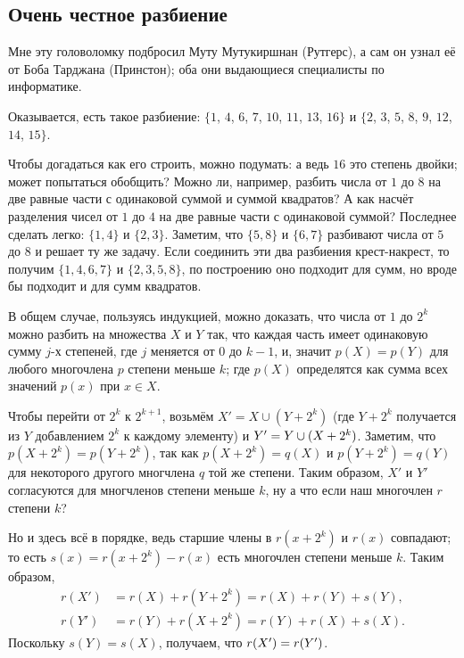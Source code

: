 \subsection*{Очень честное разбиение}

Мне эту головоломку подбросил Муту Мутукиршнан (Рутгерс),
а сам он узнал её от Боба Тарджана (Принстон);
оба они выдающиеся специалисты по информатике.

Оказывается, есть такое разбиение: $\{1$, $4$, $6$, $7$, $10$, $11$, $13$, $16\}$ и $\{2$, $3$, $5$, $8$, $9$, $12$, $14$, $15\}$.

Чтобы догадаться как его строить, можно подумать:
а ведь $16$ это степень двойки;
может попытаться обобщить?
Можно ли, например, разбить числа от $1$ до $8$ на две равные части с одинаковой суммой и суммой квадратов?
А как насчёт разделения чисел от $1$ до $4$ на две равные части с одинаковой суммой?
Последнее сделать легко: $\{1, 4\}$ и $\{2, 3\}$.
Заметим, что $\{5, 8\}$ и $\{6, 7\}$ разбивают числа от $5$ до $8$ и решает ту же задачу.
Если соединить эти два разбиения крест-накрест, то получим $\{1, 4, 6, 7\}$ и $\{2, 3, 5, 8\}$, по построению оно подходит для сумм, но вроде бы подходит и для сумм квадратов.

В общем случае, пользуясь индукцией, можно доказать, что числа от $1$ до $2^k$ можно разбить на множества $X$ и $Y$ так, что каждая часть имеет одинаковую сумму $j$-х степеней, где $j$ меняется от $0$ до $k - 1$, и, значит $p(X)=p(Y)$ для любого многочлена $p$ степени меньше $k$;
где $p(X)$ определятся как сумма всех значений $p(x)$ при $x \in X$.

Чтобы перейти от $2^{k}$ к $2^{k+1}$, возьмём $X' = X \cup (Y + 2^k)$
(где $Y + 2^k$ получается из $Y$ добавлением $2^k$ к каждому элементу) и $Y' \z= Y \cup (X + 2^k)$.
Заметим, что $p(X + 2^k) = p(Y + 2^k)$,
так как $p(X + 2^k)=q(X)$ и $p(Y + 2^k)=q(Y)$ для некоторого другого многчлена $q$ той же степени.
Таким образом, $X'$ и $Y'$ согласуются для многчленов степени меньше $k$, ну а что если наш многочлен $r$ степени $k$?

Но и здесь всё в порядке, ведь старшие члены в $r(x+2^k)$ и $r(x)$ совпадают;
то есть $s(x)=r(x+2^k)-r(x)$ есть многочлен степени меньше $k$.
Таким образом,
\begin{align*}
r(X')&=r(X)+r(Y+2^k)=r(X)+r(Y)+s(Y),
\\
r(Y')&=r(Y)+r(X+2^k)=r(Y)+r(X)+s(X).
\end{align*}
Поскольку $s(Y)=s(X)$, получаем, что $r(X')\z=r(Y')$.


